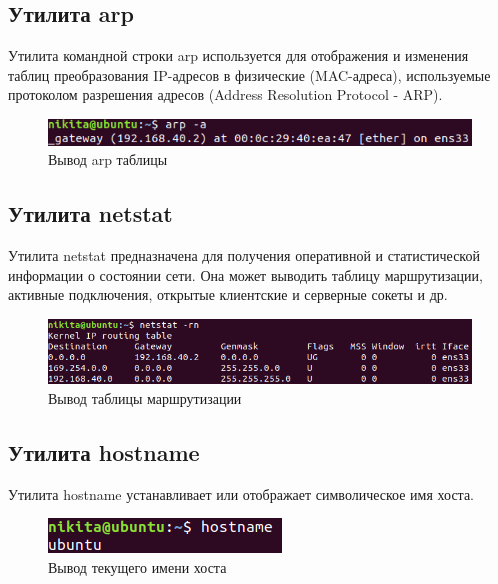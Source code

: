 \documentclass[14pt,a4paper,report]{report}
\begin{document}
\subsection{Утилита arp}

Утилита командной строки arp используется для отображения и изменения таблиц преобразования IP-адресов в физические (MAC-адреса), используемые протоколом разрешения адресов (Address Resolution Protocol - ARP). 

\begin{figure}[h!]
	\centering
	\includegraphics[scale = 0.95]{images/0_2.png}
	\caption{Вывод arp таблицы}
	\label{image:1}
\end{figure}

\subsection{Утилита netstat}

Утилита netstat предназначена для получения оперативной и статистической информации о состоянии сети. Она может выводить таблицу маршрутизации, активные подключения, открытые клиентские и серверные сокеты и др.

\begin{figure}[h!]
	\centering
	\includegraphics[scale = 0.95]{images/0_3.png}
	\caption{Вывод таблицы маршрутизации}
	\label{image:2}
\end{figure}

\subsection{Утилита hostname}

Утилита hostname устанавливает или отображает символическое имя хоста.

\begin{figure}[h!]
	\centering
	\includegraphics[scale = 0.95]{images/0_4.png}
	\caption{Вывод текущего имени хоста}
	\label{image:3}
\end{figure}
\end{document}
